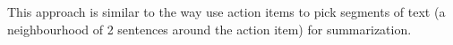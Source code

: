 This approach is similar to the way \citet{golia2024action} use action items to pick segments of
text (a neighbourhood of 2 sentences around the action item) for summarization.






